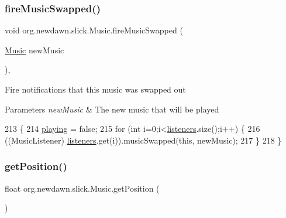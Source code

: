 \subsubsection{\texorpdfstring{fire\+Music\+Swapped()}{fireMusicSwapped()}}
{\footnotesize\ttfamily void org.\+newdawn.\+slick.\+Music.\+fire\+Music\+Swapped (\begin{DoxyParamCaption}\item[{\mbox{\hyperlink{classorg_1_1newdawn_1_1slick_1_1_music}{Music}}}]{new\+Music }\end{DoxyParamCaption})\hspace{0.3cm}{\ttfamily [inline]}, {\ttfamily [private]}}

Fire notifications that this music was swapped out


\begin{DoxyParams}{Parameters}
{\em new\+Music} & The new music that will be played \\
\hline
\end{DoxyParams}

\begin{DoxyCode}
213                                                   \{
214         \mbox{\hyperlink{classorg_1_1newdawn_1_1slick_1_1_music_a20709d497ca9027d874f7ffe970ce738}{playing}} = \textcolor{keyword}{false};
215         \textcolor{keywordflow}{for} (\textcolor{keywordtype}{int} i=0;i<\mbox{\hyperlink{classorg_1_1newdawn_1_1slick_1_1_music_ad57b22ce1f989d377f00f3c804a41db4}{listeners}}.size();i++) \{
216             ((MusicListener) \mbox{\hyperlink{classorg_1_1newdawn_1_1slick_1_1_music_ad57b22ce1f989d377f00f3c804a41db4}{listeners}}.get(i)).musicSwapped(\textcolor{keyword}{this}, newMusic);
217         \}
218     \}
\end{DoxyCode}
\mbox{\label{classorg_1_1newdawn_1_1slick_1_1_music_ae565f77bca4ad79f367d6abd90488b26}} 
\subsubsection{\texorpdfstring{get\+Position()}{getPosition()}}
{\footnotesize\ttfamily float org.\+newdawn.\+slick.\+Music.\+get\+Position (\begin{DoxyParamCaption}{ }\end{DoxyParamCaption})\hspace{0.3cm}{\ttfamily [inline]}}

